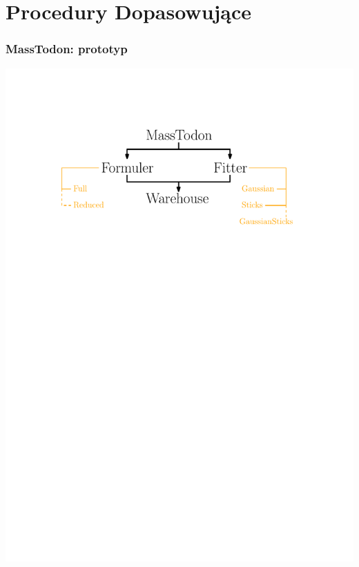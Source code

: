 \documentclass[xetex]{beamer}
\begin{document}
\section[Dopasowanie]{Procedury Dopasowujące}	

	
	\begin{frame}\frametitle{MassTodon: prototyp}	    
	    \begin{center}
	        \includegraphics[width=\textwidth,keepaspectratio]{./picts/entityDiagramme.pdf}
	    \end{center}
	\end{frame}
\end{document}
